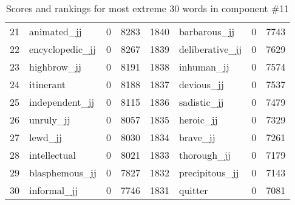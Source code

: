 \begin{table}[tbp]
\begin{tabular}{| rlr@{.}l | rlr@{.}l |}
    21 & animated\_jj & 0 & 8283    &    1840 & barbarous\_jj & 0 & 7743 \\
    22 & encyclopedic\_jj & 0 & 8267    &    1839 & deliberative\_jj & 0 & 7629 \\
    23 & highbrow\_jj & 0 & 8191    &    1838 & inhuman\_jj & 0 & 7574 \\
    24 & itinerant & 0 & 8188    &    1837 & devious\_jj & 0 & 7537 \\
    25 & independent\_jj & 0 & 8115    &    1836 & sadistic\_jj & 0 & 7479 \\
    26 & unruly\_jj & 0 & 8057    &    1835 & heroic\_jj & 0 & 7329 \\
    27 & lewd\_jj & 0 & 8030    &    1834 & brave\_jj & 0 & 7261 \\
    28 & intellectual & 0 & 8021    &    1833 & thorough\_jj & 0 & 7179 \\
    29 & blasphemous\_jj & 0 & 7827    &    1832 & precipitous\_jj & 0 & 7143 \\
    30 & informal\_jj & 0 & 7746    &    1831 & quitter & 0 & 7081 \\
    \hline
    \end{tabular}
    \caption{Scores and rankings for most extreme 30 words in component \#11} 
\end{table}
\clearpage
